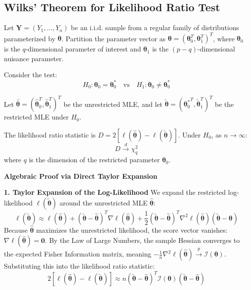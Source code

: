 \documentclass[
  letterpaper,
  DIV=11,
  numbers=noendperiod]{scrreprt}
\renewcommand{\[}{\begin{equation}}
\renewcommand{\]}{\end{equation}}
\theoremstyle{definition}
\theoremstyle{plain}
\theoremstyle{plain}
\theoremstyle{plain}
\theoremstyle{definition}
\theoremstyle{plain}
\theoremstyle{remark}
\begin{document}
\subsection{Wilks' Theorem for Likelihood Ratio
Test}\label{wilks-theorem-for-likelihood-ratio-test}

Let \(\mathbf{Y} = (Y_1, \dots, Y_n)\) be an i.i.d. sample from a
regular family of distributions parameterized by
\(\boldsymbol{\theta}\). Partition the parameter vector as
\(\boldsymbol{\theta} = (\boldsymbol{\theta}_0^T, \boldsymbol{\theta}_1^T)^T\),
where \(\boldsymbol{\theta}_0\) is the \(q\)-dimensional parameter of
interest and \(\boldsymbol{\theta}_1\) is the \((p-q)\)-dimensional
nuisance parameter.

Consider the test:
\[H_0: \boldsymbol{\theta}_0 = \boldsymbol{\theta}_0^* \quad \text{vs} \quad H_1: \boldsymbol{\theta}_0 \neq \boldsymbol{\theta}_0^*\]

Let
\(\hat{\boldsymbol{\theta}} = (\hat{\boldsymbol{\theta}}_0^T, \hat{\boldsymbol{\theta}}_1^T)^T\)
be the unrestricted MLE, and let
\(\tilde{\boldsymbol{\theta}} = ({\boldsymbol{\theta}_0^*}^T, \tilde{\boldsymbol{\theta}}_1^T)^T\)
be the restricted MLE under \(H_0\).

The likelihood ratio statistic is
\(D = 2[\ell(\hat{\boldsymbol{\theta}}) - \ell(\tilde{\boldsymbol{\theta}})]\).
Under \(H_0\), as \(n \to \infty\): \[D \xrightarrow{d} \chi^2_{q}\]
where \(q\) is the dimension of the restricted parameter
\(\boldsymbol{\theta}_0\).

\textbf{Algebraic Proof via Direct Taylor Expansion}

\textbf{1. Taylor Expansion of the Log-Likelihood} We expand the
restricted log-likelihood \(\ell(\tilde{\boldsymbol{\theta}})\) around
the unrestricted MLE \(\hat{\boldsymbol{\theta}}\):
\[\ell(\tilde{\boldsymbol{\theta}}) \approx \ell(\hat{\boldsymbol{\theta}}) + (\tilde{\boldsymbol{\theta}} - \hat{\boldsymbol{\theta}})^T \nabla \ell(\hat{\boldsymbol{\theta}}) + \frac{1}{2} (\tilde{\boldsymbol{\theta}} - \hat{\boldsymbol{\theta}})^T \nabla^2 \ell(\hat{\boldsymbol{\theta}}) (\tilde{\boldsymbol{\theta}} - \hat{\boldsymbol{\theta}})\]
Because \(\hat{\boldsymbol{\theta}}\) maximizes the unrestricted
likelihood, the score vector vanishes:
\(\nabla \ell(\hat{\boldsymbol{\theta}}) = \mathbf{0}\). By the Law of
Large Numbers, the sample Hessian converges to the expected Fisher
Information matrix, meaning
\(-\frac{1}{n} \nabla^2 \ell(\hat{\boldsymbol{\theta}}) \xrightarrow{p} \mathcal{I}(\boldsymbol{\theta})\).
Substituting this into the likelihood ratio statistic:
\[2[\ell(\hat{\boldsymbol{\theta}}) - \ell(\tilde{\boldsymbol{\theta}})] \approx n(\tilde{\boldsymbol{\theta}} - \hat{\boldsymbol{\theta}})^T \mathcal{I}(\boldsymbol{\theta}) (\tilde{\boldsymbol{\theta}} - \hat{\boldsymbol{\theta}})\]
\end{document}
